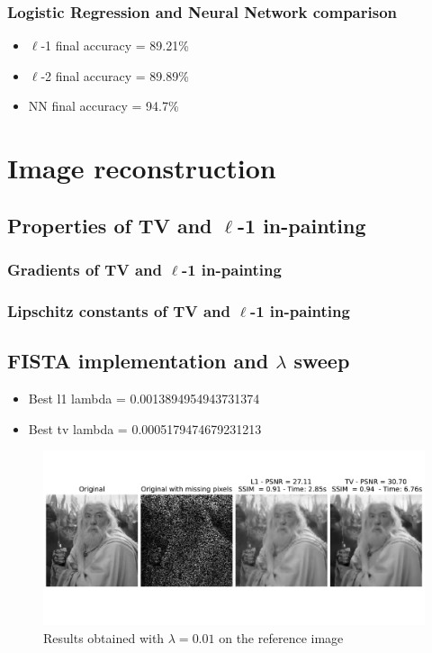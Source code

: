 \documentclass[12pt]{article}
\begin{document}
\subsubsection{Logistic Regression and Neural Network comparison}
\begin{itemize}
    \item $\ell$-1 final accuracy = 89.21\%
    \item $\ell$-2 final accuracy = 89.89\%
    \item NN final accuracy = 94.7\%
\end{itemize}

\section{Image reconstruction}
\subsection{Properties of TV and \texorpdfstring{$\ell$}{Lg}-1 in-painting}
\subsubsection{Gradients of TV and \texorpdfstring{$\ell$}{Lg}-1 in-painting}

\subsubsection{Lipschitz constants of TV and \texorpdfstring{$\ell$}{Lg}-1 in-painting}

\subsection{FISTA implementation and \texorpdfstring{$\lambda$}{Lg} sweep}

\begin{itemize}
    \item Best l1 lambda = 0.0013894954943731374
    \item Best tv lambda = 0.0005179474679231213
\end{itemize}{}

\begin{figure}
    \centering
    \includegraphics[width=17cm]{hw3/codes/exercise2/results/gandalf_0-01.pdf}
    \caption{Results obtained with $\lambda = 0.01$ on the reference image}
    \label{fig:gandalf-reconstruction}
\end{figure}
\end{document}
